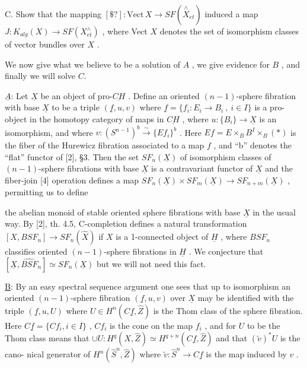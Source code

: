 \documentclass[11pt]{article}
\newcommand{\scanpage}[1]{\par\bigskip\noindent{\small\sffamily[scan #1]}\par}
\newcommand{\mspage}[1]{{\small\sffamily[p.\,#1]}}
\newcommand{\hand}[1]{\textcolor{blue}{#1}}
\newcommand{\unsure}[1]{[#1?]}
\begin{document}
C. Show that the mapping $\unsure{\$}{:}\mathrm{Vect}\,X \to SF(\overset{\wedge}{X}_{et})$ induced a map
$J{:}K_{alg}(X) \to SF(X^{\wedge}_{et})$ , where Vect $X$ denotes the set of isomorphism
classes of vector bundles over $X$ .

We now give what we believe to be a solution of $A$ , we give
evidence for $B$ , and finally we will solve $C$.

$\underline{A}$: Let $\underline{X}$ be an object of pro-$\underline{CH}$ . Define an oriented
$(n - 1)$-sphere fibration with base $\underline{X}$ to be a triple $(\underline{f},u,v)$
where $\underline{f} = \{f_{i}{:}E_{i} \to B_{i}\ ,\ i \in I\}$ is a pro-object in the homotopy
category of maps in $\underline{CH}$ , where $u{:}\{B_{i}\} \to \underline{X}$ is an isomorphism,
and where $v{:}(S^{n-1})^{b} \xrightarrow{\sim} \{Ef_{i}\}^{b}$ . Here $Ef = E\times_{B}B^{I}\times_{B}(*)$ is the
fiber of the Hurewicz fibration associated to a map $f$ , and ``b''
denotes the ``flat'' functor of [2], §3. Then the set $SF_{n}(\underline{X})$ of
isomorphism classes of $(n - 1)$-sphere fibrations with base $\underline{X}$
is a contravariant functor of $\underline{X}$ and the fiber-join [4] operation
defines a map $SF_{n}(\underline{X})\times SF_{m}(\underline{X}) \to SF_{n+m}(\underline{X})$ , permitting us to define

\mspage{\hand{62}}

\clearpage
\scanpage{162-5/63}
\mspage{- 7 -}

the abelian monoid of stable oriented sphere fibrations with base
$\underline{X}$ in the usual way. By [2], th. 4.5, C-completion defines a
natural transformation $[X,BSF_n] \to SF_n(\hat{X})$ if $X$ is a 1-connected
object of $\underline{H}$ , where $BSF_n$ classifies oriented $(n - 1)$-sphere
fibrations in $\underline{H}$ . We conjecture that $[\underline{X},\widehat{BSF}_n] \simeq SF_n(\underline{X})$ but we
will not need this fact.

\underline{B}: By an easy spectral sequence argument one sees that up to
isomorphism an oriented $(n - 1)$-sphere fibration $(\underline{f},u,v)$ over $\underline{X}$
may be identified with the triple $(\underline{f},u,U)$ where $U \in H^n(C\underline{f},\hat{Z})$ is
the Thom class of the sphere fibration. Here $C\underline{f} = \{Cf_i, i \in I\}$ ,
$Cf_i$ is the cone on the map $f_i$ , and for $U$ to be the Thom class
means that $\cup U : H^q(X,\hat{Z}) \simeq H^{q+n}(C\underline{f},\hat{Z})$ and that $(\tilde{v})^*U$ is the cano-%
nical generator of $H^n(\hat{S}^n,\hat{Z})$ where $\tilde{v} : \hat{S}^n \to C\underline{f}$ is the map induced
by $v$ .
\end{document}
